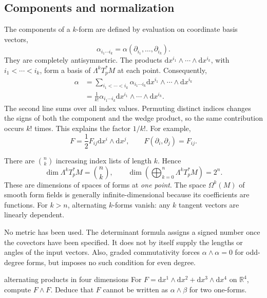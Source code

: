 \documentclass[11pt,a4paper]{article}
\numberwithin{equation}{section}
\newcommand{\R}{\mathbb R}
\newcommand{\dd}{\mathrm d}
\begin{document}
\subsection{Components and normalization}

The components of a \(k\)-form are defined by evaluation on coordinate
basis vectors,
\[
 \alpha_{i_1\cdots i_k}
 =\alpha(\partial_{i_1},\ldots,\partial_{i_k}).
\]
They are completely antisymmetric. The products
\(\dd x^{i_1}\wedge\cdots\wedge\dd x^{i_k}\), with
\(i_1<\cdots<i_k\), form a basis of \(\Lambda^kT_p^*M\) at each point.
Consequently,
\begin{equation}
 \begin{aligned}
 \alpha
 &=\sum_{i_1<\cdots<i_k}\alpha_{i_1\cdots i_k}
       \dd x^{i_1}\wedge\cdots\wedge\dd x^{i_k}\\
 &=\frac1{k!}\alpha_{i_1\cdots i_k}
       \dd x^{i_1}\wedge\cdots\wedge\dd x^{i_k}.
 \end{aligned}
 \label{eq:form-components}
\end{equation}
The second line sums over all index values. Permuting distinct indices
changes the signs of both the component and the wedge product, so the
same contribution occurs \(k!\) times. This explains the factor
\(1/k!\). For example,
\[
 F=\frac12F_{ij}\dd x^i\wedge\dd x^j,
 \qquad F(\partial_i,\partial_j)=F_{ij}.
\]

There are \(\binom nk\) increasing index lists of length \(k\). Hence
\[
 \dim\Lambda^kT_p^*M=\binom nk,
 \qquad
 \dim\left(\bigoplus_{k=0}^n\Lambda^kT_p^*M\right)=2^n.
\]
These are dimensions of spaces of forms at \emph{one point}. The space
\(\Omega^k(M)\) of smooth form fields is generally infinite-dimensional
because its coefficients are functions. For \(k>n\), alternating
\(k\)-forms vanish: any \(k\) tangent vectors are linearly dependent.

No metric has been used. The determinant formula assigns a signed
number once the covectors have been specified. It does not by itself
supply the lengths or angles of the input vectors. Also, graded
commutativity forces \(\alpha\wedge\alpha=0\) for odd-degree forms,
but imposes no such condition for even degree.

\begin{studentwork}[3.2cm]{alternating products in four dimensions}
For \(F=\dd x^1\wedge\dd x^2+\dd x^3\wedge\dd x^4\) on \(\R^4\),
compute \(F\wedge F\). Deduce that \(F\) cannot be written as
\(\alpha\wedge\beta\) for two one-forms.
\end{studentwork}
\end{document}
